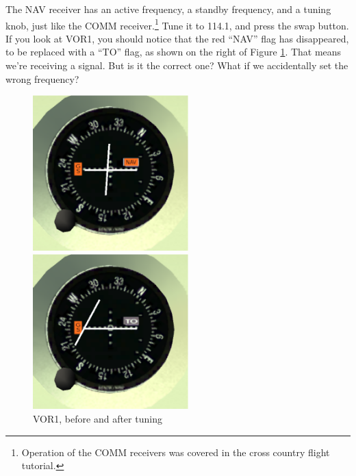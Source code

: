The NAV receiver has an active frequency, a standby frequency, and a
tuning knob, just like the COMM receiver.\footnote{Operation of the
  COMM receivers was covered in the cross country flight tutorial.}
Tune it to 114.1, and press the swap button.  If you look at VOR1, you should notice that the red ``NAV''
flag has disappeared, to be replaced with a ``TO'' flag, as shown on
the right of Figure \ref{fig:VOR1}.  That means we're receiving a
signal.  But is it the correct one?  What if we accidentally set the
wrong frequency?

\begin{figure}
  \begin{minipage}[b]{0.5\linewidth}
    \includegraphics[width=6cm]{img/VOR1_before}
  \end{minipage}
  \hspace{0.5cm}
  \begin{minipage}[b]{0.5\linewidth}
    \includegraphics[width=6cm]{img/VOR1_after}
  \end{minipage}
  \caption{VOR1, before and after tuning}
  \label{fig:VOR1}
\end{figure}

